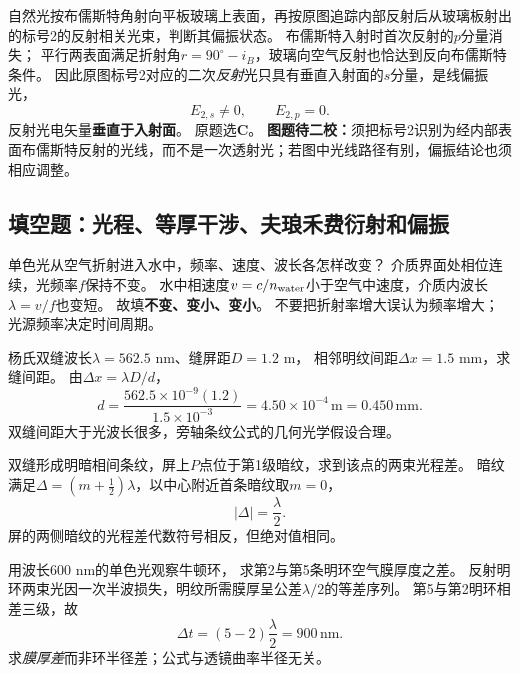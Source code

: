 \problemtext 自然光按布儒斯特角射向平板玻璃上表面，再按原图追踪内部反射后从玻璃板射出的标号2的反射相关光束，判断其偏振状态。
\workings
布儒斯特入射时首次反射的$p$分量消失；
平行两表面满足折射角$r=90^\circ-i_B$，玻璃向空气反射也恰达到反向布儒斯特条件。
因此原图标号2对应的二次\emph{反射}光只具有垂直入射面的$s$分量，是线偏振光，
\[
\boxed{E_{2,s}\ne0,\qquad E_{2,p}=0}.
\]
反射光电矢量\textbf{垂直于入射面}。
原题选\textbf{C}。
\crosscheck \textbf{图题待二校：}须把标号2识别为经内部表面布儒斯特反射的光线，而不是一次透射光；若图中光线路径有别，偏振结论也须相应调整。


\subsection{填空题：光程、等厚干涉、夫琅禾费衍射和偏振}

\problemtext 单色光从空气折射进入水中，频率、速度、波长各怎样改变？
\workings
介质界面处相位连续，光频率$f$保持不变。
水中相速度$v=c/n_{\rm water}$小于空气中速度，介质内波长$\lambda=v/f$也变短。
故填\textbf{不变、变小、变小}。
\crosscheck 不要把折射率增大误认为频率增大；光源频率决定时间周期。

\problemtext 杨氏双缝波长$\lambda=562.5$ nm、缝屏距$D=1.2$ m，
相邻明纹间距$\Delta x=1.5$ mm，求缝间距。
\workings
由$\Delta x=\lambda D/d$，
\[
\boxed{d=\frac{562.5\times10^{-9}(1.2)}{1.5\times10^{-3}}
=4.50\times10^{-4}\,\mathrm m=0.450\,\mathrm{mm}}.
\]
\crosscheck 双缝间距大于光波长很多，旁轴条纹公式的几何光学假设合理。

\problemtext 双缝形成明暗相间条纹，屏上$P$点位于第1级暗纹，求到该点的两束光程差。
\workings
暗纹满足$\Delta=(m+\tfrac12)\lambda$，以中心附近首条暗纹取$m=0$，
\[
\boxed{|\Delta|=\frac{\lambda}{2}}.
\]
\crosscheck 屏的两侧暗纹的光程差代数符号相反，但绝对值相同。

\problemtext 用波长$600$ nm的单色光观察牛顿环，
求第2与第5条明环空气膜厚度之差。
\workings
反射明环两束光因一次半波损失，明纹所需膜厚呈公差$\lambda/2$的等差序列。
第5与第2明环相差三级，故
\[
\boxed{\Delta t=(5-2)\frac{\lambda}{2}=900\,\mathrm{nm}}.
\]
\crosscheck 求\emph{膜厚差}而非环半径差；公式与透镜曲率半径无关。

